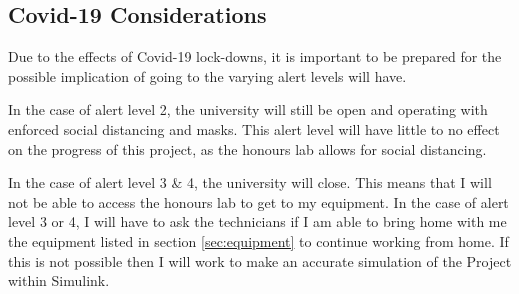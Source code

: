 \documentclass[11pt, a4paper, oneside]{report}
\begin{document}
\subsection{Covid-19 Considerations}

Due to the effects of Covid-19 lock-downs, it is important to be prepared for the possible implication of going to the varying alert levels will have.

In the case of alert level 2, the university will still be open and operating with enforced social distancing and masks. This alert level will have little to no effect on the progress of this project, as the honours lab allows for social distancing.

In the case of alert level 3 \& 4, the university will close. This means that I will not be able to access the honours lab to get to my equipment. In the case of alert level 3 or 4, I will have to ask the technicians if I am able to bring home with me the equipment listed in section \ref{sec:equipment} to continue working from home. If this is not possible then I will work to make an accurate simulation of the Project within Simulink.


\backmatter



\end{document}
